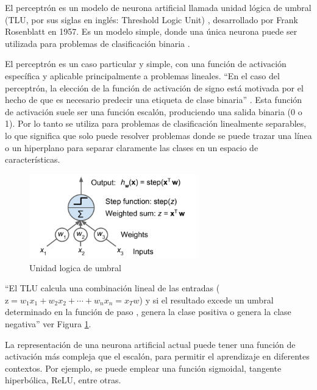 El perceptrón es un modelo de neurona artificial llamada unidad lógica de umbral (TLU, por sus siglas en inglés: Threshold Logic Unit) , desarrollado por Frank Rosenblatt en 1957. Es un modelo simple, donde una única neurona puede ser utilizada para problemas de clasificación binaria \cite{rosenblatt1957perceptron}.

El perceptrón es un caso particular y simple, con una función de activación específica y aplicable principalmente a problemas lineales. “En el caso del perceptrón, la elección de la función de activación de signo está motivada por el hecho de que es necesario predecir una etiqueta de clase binaria” \cite[p. 11]{aggarwal2018neural}. Esta función de activación suele ser una función escalón, produciendo una salida binaria (0 o 1).  Por lo tanto se utiliza para problemas de clasificación linealmente separables, lo que significa que solo puede resolver problemas donde se puede trazar una línea o un hiperplano para separar claramente las clases en un espacio de características.

\begin{figure}
	
	\includegraphics[width=0.65\textwidth]{capitulo2/figuras/an4.png}
	\caption{Unidad logica de umbral}
	\label{fig:an4}
\end{figure}

``El TLU calcula una combinación lineal de las entradas ( $\text{z} = w_1x_1 + w_2x_2 + \cdots + w_nx_n = x_Tw$) y si el resultado excede un umbral determinado en la función de paso , genera la clase positiva o genera la clase negativa''\cite[p. 282]{geron2019hands} ver Figura \ref{fig:an4}. 

La representación de una neurona artificial actual puede tener una función de activación más compleja que el escalón,  para permitir el aprendizaje en diferentes contextos. Por ejemplo, se puede emplear una función sigmoidal, tangente hiperbólica, ReLU, entre otras.






